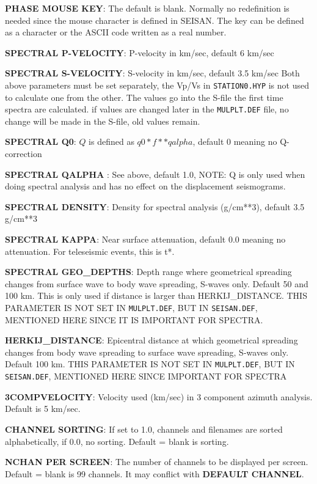 \textbf{PHASE MOUSE KEY}: The default is blank. Normally no redefinition is needed since the mouse character is defined in SEISAN. The key can be defined as a character or the ASCII code written as a real number. 

\textbf{SPECTRAL P-VELOCITY}: P-velocity in km/sec, default 6 km/sec 

\textbf{SPECTRAL S-VELOCITY}: S-velocity in km/sec, default  3.5 km/sec Both above parameters must be set separately, the Vp/Vs in \texttt{STATION0.HYP} is not used to calculate one from the other. The values go into the S-file the first time spectra are calculated. if values are changed later in the \texttt{MULPLT.DEF} file, no change will be made in the S-file, old values remain. 

\textbf{SPECTRAL Q0}:  $Q$ is defined as $q0 * f**qalpha$, default 0 meaning no Q-correction 

\textbf{SPECTRAL QALPHA }: See above, default 1.0, NOTE: Q is only used when doing spectral analysis and has no effect on the displacement seismograms. 

\textbf{SPECTRAL DENSITY}: Density for spectral analysis (g/cm**3), default 3.5 g/cm**3 

\textbf{SPECTRAL KAPPA}: Near surface attenuation, default 0.0 meaning no attenuation. For teleseismic events, this is t*. 

\textbf{SPECTRAL GEO\_DEPTHS}: Depth range where geometrical spreading changes from surface wave to body wave spreading, S-waves only. Default 50 and 100 km. This is only used if distance is larger than HERKIJ\_DISTANCE. THIS PARAMETER IS NOT SET IN \texttt{MULPLT.DEF}, BUT IN \texttt{SEISAN.DEF}, MENTIONED HERE SINCE IT IS IMPORTANT FOR SPECTRA. 

\textbf{HERKIJ\_DISTANCE}: Epicentral distance at which geometrical spreading changes from body wave spreading to surface wave spreading, S-waves only. Default 100 km.  THIS PARAMETER IS NOT SET IN \texttt{MULPLT.DEF}, BUT IN \texttt{SEISAN.DEF}, MENTIONED HERE SINCE IMPORTANT FOR SPECTRA 

\textbf{3COMPVELOCITY}: Velocity used (km/sec) in 3 component azimuth analysis. Default is 5 km/sec. 

\textbf{CHANNEL SORTING}: If set to 1.0, channels and filenames are sorted alphabetically, if 0.0, no sorting. Default = blank is sorting. 

\textbf{NCHAN PER SCREEN}: The number of channels to be displayed per screen. 
Default = blank is 99 channels. 
It may conflict with \textbf{DEFAULT CHANNEL}.


